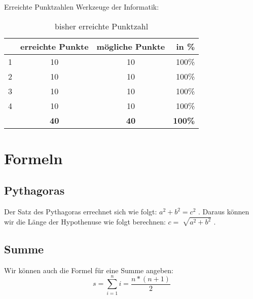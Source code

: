 \documentclass[11pt]{article}
\begin{document}
\noindent Erreichte Punktzahlen Werkzeuge der Informatik:

\begin{table}[!th]

\begin{tabular}{r|c|c|r}

& \textbf{erreichte Punkte} & \textbf{mögliche Punkte} & \textbf{in \%} \\
\hline
1 & 10 & 10 & 100\% \\
2 & 10 & 10 & 100\% \\
3 & 10 & 10 & 100\% \\
4 & 10 & 10 & 100\% \\
\hline
& \textbf{40} & \textbf{40} & \textbf{100\%} \\

\end{tabular}
\caption{bisher erreichte Punktzahl}
\end{table}


\section{Formeln}

\subsection{Pythagoras}
Der Satz des Pythagoras errechnet sich wie folgt: $a^{2} + b^{2} = c^{2}$ .
Daraus können wir die Länge der Hypothenuse wie folgt berechnen: $c = \sqrt[]{a^{2} + b^{2}}$ . 

\subsection{Summe}
Wir können auch die Formel für eine Summe angeben:
\begin{equation} 
s = \sum_{i=1}^n i = \frac{n * (n + 1)}{2}
\end{equation}
\end{document}
